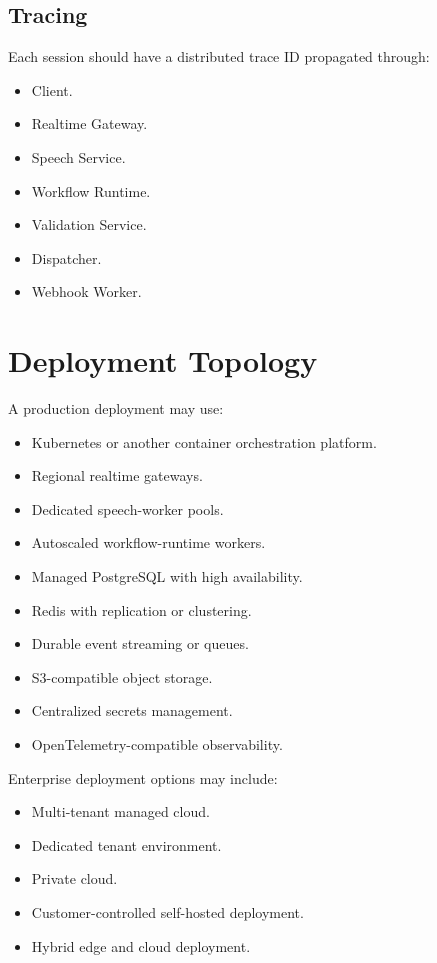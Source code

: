 \documentclass[11pt,a4paper]{article}
\begin{document}
\subsection{Tracing}

Each session should have a distributed trace ID propagated through:

\begin{itemize}
\item Client.
\item Realtime Gateway.
\item Speech Service.
\item Workflow Runtime.
\item Validation Service.
\item Dispatcher.
\item Webhook Worker.
\end{itemize}

\section{Deployment Topology}

A production deployment may use:

\begin{itemize}
\item Kubernetes or another container orchestration platform.
\item Regional realtime gateways.
\item Dedicated speech-worker pools.
\item Autoscaled workflow-runtime workers.
\item Managed PostgreSQL with high availability.
\item Redis with replication or clustering.
\item Durable event streaming or queues.
\item S3-compatible object storage.
\item Centralized secrets management.
\item OpenTelemetry-compatible observability.
\end{itemize}

Enterprise deployment options may include:

\begin{itemize}
\item Multi-tenant managed cloud.
\item Dedicated tenant environment.
\item Private cloud.
\item Customer-controlled self-hosted deployment.
\item Hybrid edge and cloud deployment.
\end{itemize}
\end{document}
